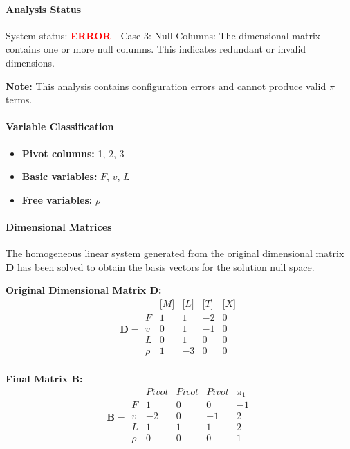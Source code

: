 \paragraph{Analysis Status}
System status: \textcolor{red}{\textbf{ERROR}} - Case 3: Null Columns: The dimensional matrix contains one or more null columns. This indicates redundant or invalid dimensions.

\textbf{Note:} This analysis contains configuration errors and cannot produce valid $\pi$ terms.


\paragraph{Variable Classification}
\begin{itemize}
\item \textbf{Pivot columns:} 1, 2, 3
\item \textbf{Basic variables:} $F$, $v$, $L$
\item \textbf{Free variables:} $\rho$
\end{itemize}

                \paragraph{Dimensional Matrices}
                The homogeneous linear system generated from the original dimensional matrix $\mathbf{D}$ has been solved to obtain the basis vectors for the solution null space.

                \textbf{Original Dimensional Matrix $\mathbf{D}$:}
                \[\mathbf{D} = \begin{array}{r|rrrr}
                & \text{[}M\text{]} & \text{[}L\text{]} & \text{[}T\text{]} & \text{[}X\text{]} \\
                \hline
                F & 1 & 1 & -2 & 0 \\
v & 0 & 1 & -1 & 0 \\
L & 0 & 1 & 0 & 0 \\
\rho & 1 & -3 & 0 & 0 \\

                \end{array}\]


        \textbf{Final Matrix $\mathbf{B}$:}
        \[\mathbf{B} = \begin{array}{r|rrrr}
        & Pivot & Pivot & Pivot & \pi_{1} \\
        \hline
        F & 1 & 0 & 0 & -1 \\
v & -2 & 0 & -1 & 2 \\
L & 1 & 1 & 1 & 2 \\
\rho & 0 & 0 & 0 & 1 \\

        \end{array}\]


